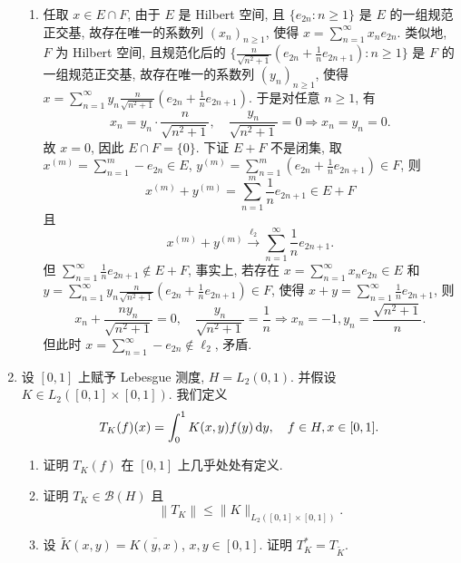 \begin{enumerate}
\begin{answer}
\begin{enumerate}
        \item 任取 $x\in E\cap F$, 由于 $E$ 是 Hilbert 空间, 且
        $\{e_{2n}:n\geq 1\}$ 是 $E$ 的一组规范正交基, 故存在唯一的系数列 $(x_n)_{n\geq 1}$,
        使得 $x=\sum_{n=1}^{\infty}x_n e_{2n}$. 类似地, $F$ 为 Hilbert 空间, 且规范化后的
        $\{\frac{n}{\sqrt{n^2+1}}(e_{2n}+\frac{1}{n}e_{2n+1}):n\geq 1\}$ 是 $F$ 的一组规范正交基,
        故存在唯一的系数列 $(y_n)_{n\geq 1}$, 
        使得 $x=\sum_{n=1}^{\infty}y_n\frac{n}{\sqrt{n^2+1}}(e_{2n}+\frac{1}{n}e_{2n+1})$.
        于是对任意 $n\geq 1$, 有
        \[x_n=y_n\cdot\frac{n}{\sqrt{n^2+1}},\quad\frac{y_n}{\sqrt{n^2+1}}=0\Longrightarrow x_n=y_n=0.\]
        故 $x=0$, 因此 $E\cap F=\{0\}$. 下证 $E+F$ 不是闭集,
        取 $x^{(m)}=\sum_{n=1}^m -e_{2n}\in E$, $y^{(m)}=\sum_{n=1}^m (e_{2n}+\frac{1}{n}e_{2n+1})\in F$,
        则
        \[x^{(m)}+y^{(m)}=\sum_{n=1}^m \frac{1}{n}e_{2n+1}\in E+F\]
        且
        \[x^{(m)}+y^{(m)}\xrightarrow{\ell_2}\sum_{n=1}^{\infty}\frac{1}{n}e_{2n+1}.\]
        但 $\sum_{n=1}^{\infty}\frac{1}{n}e_{2n+1}\notin E+F$, 事实上, 若存在
        $x=\sum_{n=1}^{\infty}x_n e_{2n}\in E$ 和 $y=\sum_{n=1}^{\infty}y_n\frac{n}{\sqrt{n^2+1}}(e_{2n}+\frac{1}{n}e_{2n+1})\in F$,
        使得 $x+y=\sum_{n=1}^{\infty}\frac{1}{n}e_{2n+1}$, 则
        \[x_n+\frac{ny_n}{\sqrt{n^2+1}}=0,\quad\frac{y_n}{\sqrt{n^2+1}}=\frac{1}{n}\Longrightarrow x_n=-1,y_n=\frac{\sqrt{n^2+1}}{n}.\]
        但此时 $x=\sum_{n=1}^{\infty}-e_{2n}\notin\ell_2$, 矛盾.
      \end{enumerate}
    \end{answer}
  \item 设 $[0,1]$ 上赋予 Lebesgue 测度, $H=L_{2}(0,1)$. 并假设 $K \in L_{2}([0,1] \times[0,1])$. 我们定义
  \[
  T_{K}(f)(x)=\int_{0}^{1} K(x, y) f(y)\mathop{}\!\mathrm{d} y, \quad f \in H, x \in[0,1].
  \]

    \begin{enumerate}
      \item 证明 $T_{K}(f)$ 在 $[0,1]$ 上几乎处处有定义.

      \item 证明 $T_{K} \in\mathcal{B}(H)$ 且
      \[
      \left\|T_{K}\right\|\leq\|K\|_{L_{2}([0,1] \times[0,1])}.
      \]
  
      \item 设 $\widetilde{K}(x, y)=\overline{K(y, x)}$, $x,y\in[0,1]$. 证明 $T_{K}^{*}=T_{\tilde{K}}$.
  

\end{enumerate}
\end{enumerate}
